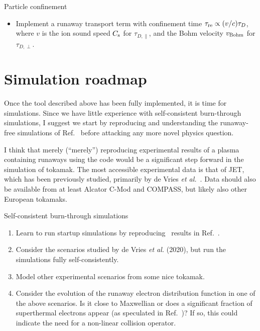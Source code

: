 \documentclass{notes}
\begin{document}
    \begin{summarybox}{Particle confinement}
        \begin{itemize}
            \item Implement a runaway transport term with confinement time
            $\tau_{\rm re}\propto (v/c)\tau_D$, where $v$ is the ion sound speed
            $C_{\rm s}$ for $\tau_{D,\|}$, and the Bohm velocity $v_{\rm Bohm}$
            for $\tau_{D,\perp}$.
        \end{itemize}
    \end{summarybox}

    \section{Simulation roadmap}
    Once the tool described above has been fully implemented, it is time for
    simulations. Since we have little experience with self-consistent
    burn-through simulations, I suggest we start by reproducing and
    understanding the runaway-free simulations of Ref.~\cite{Kim2012} before
    attacking any more novel physics question.

    I think that merely (``merely'') reproducing experimental results of a
    plasma containing runaways using the code would be a significant step
    forward in the simulation of tokamak. The most accessible experimental data
    is that of JET, which has been previously studied, primarily by de Vries
    {\em et al.}~\cite{deVries2020}. Data should also be available from at least
    Alcator C-Mod and COMPASS, but likely also other European tokamaks.

    \begin{taskbox}{Self-consistent burn-through simulations}
        \begin{enumerate}
            \item Learn to run startup simulations by reproducing \DYON\ results
            in Ref.~\cite{Kim2012}.
            \item Consider the scenarios studied by de Vries {\em et al.} (2020), but run
            the simulations fully self-consistently.
            \item Model other experimental scenarios from some nice tokamak.
            \item Consider the evolution of the runaway electron distribution
            function in one of the above scenarios. Is it close to Maxwellian
            or does a significant fraction of superthermal electrons appear
            (as speculated in Ref.~\cite{deVries2019})? If so, this could
            indicate the need for a non-linear collision operator.
        \end{enumerate}
    \end{taskbox}
\end{document}
